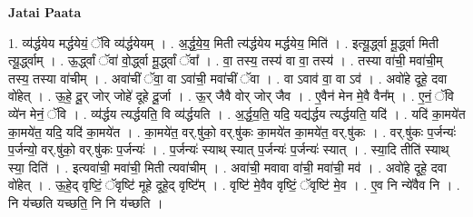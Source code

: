 \documentclass[17pt]{extarticle}
\begin{document}
\textbf{Jatai Paata} \newline

1. व्य॑र्द्धयेय मर्द्धयेयं॒ ॅवि व्य॑र्द्धयेयम् । . अ॒र्द्ध॒ये॒य॒ मिती त्य॑र्द्धयेय मर्द्धयेय॒ मिति॑ । . इत्यू॒र्द्ध्वा मू॒र्द्ध्वा मिती त्यू॒र्द्ध्वाम् । . ऊ॒र्द्ध्वां ॅवा॑ वो॒र्द्ध्वा मू॒र्द्ध्वां ॅवा᳚ । . वा॒ तस्य॒ तस्य॑ वा वा॒ तस्य॑ । . तस्या वा॑ची॒ मवा॑ची॒म् तस्य॒ तस्या वा॑चीम् । . अवा॑चीं ॅवा॒ वा ऽवा॑ची॒ मवा॑चीं ॅवा । . वा ऽवाव॑ वा॒ वा ऽव॑ । . अवो॑हे दूहे॒ दवा वो॑हेत् । . ऊ॒हे॒ दू॒र् जोर् जोहे॑ दूहे दू॒र्जा । . ऊ॒र् जैवै वोर् जोर् जैव । . ए॒वैन॑ मेन मे॒वै वैन᳚म् । . ए॒नं॒ ॅवि व्ये॑न मेनं॒ ॅवि । . व्य॑र्द्धय त्यर्द्धयति॒ वि व्य॑र्द्धयति । . अ॒र्द्ध॒य॒ति॒ यदि॒ यद्य॑र्द्धय त्यर्द्धयति॒ यदि॑ । . यदि॑ का॒मये॑त का॒मये॑त॒ यदि॒ यदि॑ का॒मये॑त । . का॒मये॑त॒ वर्.षु॑को॒ वर्.षु॑कः का॒मये॑त का॒मये॑त॒ वर्.षु॑कः । . वर्.षु॑कः प॒र्जन्यः॑ प॒र्जन्यो॒ वर्.षु॑को॒ वर्.षु॑कः प॒र्जन्यः॑ । . प॒र्जन्यः॑ स्याथ् स्यात् प॒र्जन्यः॑ प॒र्जन्यः॑ स्यात् । . स्या॒दि तीति॑ स्याथ् स्या॒ दिति॑ । . इत्यवा॑ची॒ मवा॑ची॒ मिती त्यवा॑चीम् । . अवा॑ची॒ मवावा वा॑ची॒ मवा॑ची॒ मव॑ । . अवो॑हे दूहे॒ दवा वो॑हेत् । . ऊ॒हे॒द् वृष्टिं॒ ॅवृष्टि॑ मूहे दूहे॒द् वृष्टि᳚म् । . वृष्टि॑ मे॒वैव वृष्टिं॒ ॅवृष्टि॑ मे॒व । . ए॒व नि न्ये॑वैव नि । . नि य॑च्छति यच्छति॒ नि नि य॑च्छति । \newline
\end{document}
